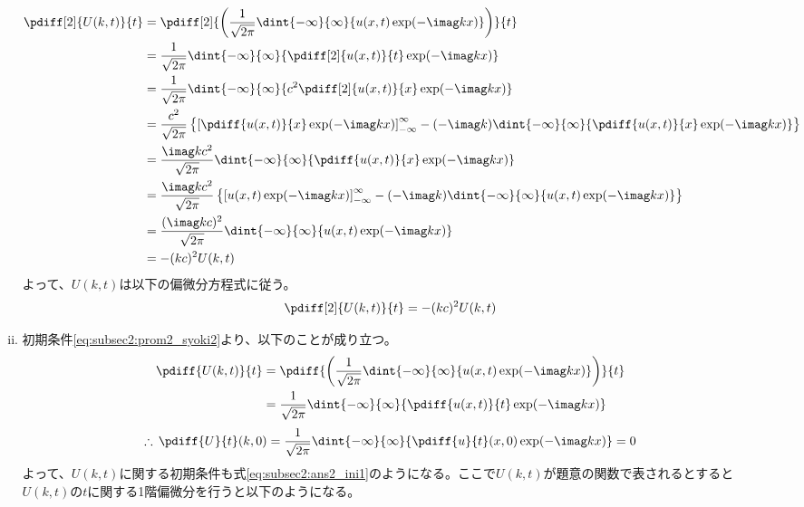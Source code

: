 \documentclass[dvipdfmx,titlepage, 11pt, a4paper]{jsarticle}%
\begin{document}
\begin{enumerate}[(1)]
\begin{enumerate}[(i)]
\begin{align*}
            \pdiff[2]{U(k, t)}{t} 
            & = \pdiff[2]{\left(\frac{1}{\sqrt{2\pi}}\dint{-\infty}{\infty}{u(x, t)\exp(-\imag kx)}\right)}{t}\\
            & = \frac{1}{\sqrt{2\pi}}\dint{-\infty}{\infty}{\pdiff[2]{u(x, t)}{t}\exp(-\imag kx)}\\
            & = \frac{1}{\sqrt{2\pi}}\dint{-\infty}{\infty}{c^{2}\pdiff[2]{u(x, t)}{x}\exp(-\imag kx)}\\
            & = \frac{c^{2}}{\sqrt{2\pi}}\left\{\left[\pdiff{u(x, t)}{x}\exp(-\imag kx)\right]_{-\infty}^{\infty} - (-\imag k)\dint{-\infty}{\infty}{\pdiff{u(x, t)}{x}\exp(-\imag kx)}\right\}\\
            & = \frac{\imag kc^{2}}{\sqrt{2\pi}}\dint{-\infty}{\infty}{\pdiff{u(x, t)}{x}\exp(-\imag kx)}\\
            & = \frac{\imag kc^{2}}{\sqrt{2\pi}}\left\{\left[u(x, t)\exp(-\imag kx)\right]_{-\infty}^{\infty} - (-\imag k)\dint{-\infty}{\infty}{u(x, t)\exp(-\imag kx)}\right\}\\
            & = \frac{(\imag kc)^{2}}{\sqrt{2\pi}}\dint{-\infty}{\infty}{u(x, t)\exp(-\imag kx)}\\
            & = -(kc)^{2}U(k, t)
        \end{align*}
        よって、$U(k, t)$は以下の偏微分方程式に従う。
        \begin{equation}
            \pdiff[2]{U(k, t)}{t} = -(kc)^{2}U(k, t)\label{eq:subsec2:ans1}
        \end{equation}
        \item 初期条件\eqref{eq:subsec2:prom2_syoki2}より、以下のことが成り立つ。
        \begin{align*}
            \pdiff{U(k, t)}{t} 
            & = \pdiff{\left(\frac{1}{\sqrt{2\pi}}\dint{-\infty}{\infty}{u(x, t)\exp(-\imag kx)}\right)}{t}\\
            & = \frac{1}{\sqrt{2\pi}}\dint{-\infty}{\infty}{\pdiff{u(x, t)}{t}\exp(-\imag kx)}\\
        \end{align*}
        \begin{equation}
            \therefore\, \pdiff{U}{t}(k, 0) 
             = \frac{1}{\sqrt{2\pi}}\dint{-\infty}{\infty}{\pdiff{u}{t}(x, 0)\exp(-\imag kx)} = 0\label{eq:subsec2:ans2_ini1}
        \end{equation}
        よって、$U(k, t)$に関する初期条件も式\eqref{eq:subsec2:ans2_ini1}のようになる。ここで$U(k, t)$が題意の関数で表されるとすると
        $U(k, t)$の$t$に関する1階偏微分を行うと以下のようになる。

\end{enumerate}
\end{enumerate}
\end{document}
